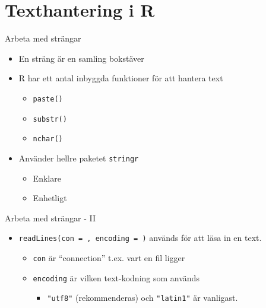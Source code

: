 \documentclass[
  11pt,
  ignorenonframetext,
  handout]{beamer}
\providecommand{\tightlist}{%
  \setlength{\itemsep}{0pt}\setlength{\parskip}{0pt}}
\begin{document}
\hypertarget{texthantering-i-r}{%
\section{Texthantering i R}\label{texthantering-i-r}}


\begin{frame}{Arbeta med strängar}
\protect\hypertarget{arbeta-med-struxe4ngar}{}
\begin{itemize}
\tightlist
\item
  En sträng är en samling bokstäver
\item
  R har ett antal inbyggda funktioner för att hantera text

  \begin{itemize}
  \tightlist
  \item
    \texttt{paste()}
  \item
    \texttt{substr()}
  \item
    \texttt{nchar()}
  \end{itemize}
\item
  Använder hellre paketet \texttt{stringr}

  \begin{itemize}
  \tightlist
  \item
    Enklare
  \item
    Enhetligt
  \end{itemize}
\end{itemize}
\end{frame}


\begin{frame}{Arbeta med strängar - II}
\protect\hypertarget{arbeta-med-struxe4ngar---ii}{}
\begin{itemize}
\tightlist
\item
  \texttt{readLines(con = , encoding = )} används för att läsa in en
  text.

  \begin{itemize}
  \tightlist
  \item
    \texttt{con} är ``connection'' t.ex. vart en fil ligger
  \item
    \texttt{encoding} är vilken text-kodning som används

    \begin{itemize}
    \tightlist
    \item
      \texttt{"utf8"} (rekommenderas) och \texttt{"latin1"}  är vanligast.
    \end{itemize}
  \end{itemize}
\end{itemize}
\end{frame}
\end{document}
